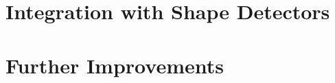 \documentclass[conference]{IEEEtran}
\begin{document}
\section{Integration with Shape Detectors}
\newpage
\section{Further Improvements}
\end{document}
